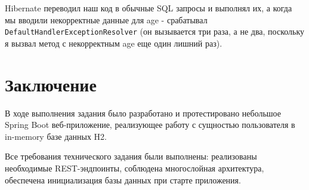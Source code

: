\documentclass[a4paper, 14pt]{article}
\begin{document}
Hibernate переводил наш код в обычные SQL запросы и выполнял их, а когда мы вводили некорректные данные для age - срабатывал \texttt{DefaultHandlerExceptionResolver} (он вызывается три раза, а не два, поскольку я вызвал метод с некорректным age еще один лишний раз).

\newpage
\section{Заключение}

В ходе выполнения задания было разработано и протестировано небольшое Spring Boot веб-приложение, реализующее работу с сущностью пользователя в in-memory базе данных H2.

Все требования технического задания были выполнены: реализованы необходимые REST-эндпоинты, соблюдена многослойная архитектура, обеспечена инициализация базы данных при старте приложения.
\end{document}
